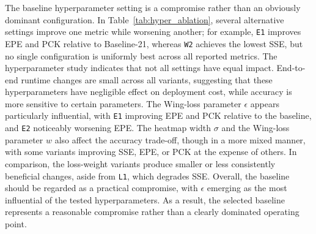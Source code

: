 ﻿\documentclass[10pt,letterpaper]{article}
\begin{document}
\medskip
\noindent
The baseline hyperparameter setting is a compromise rather than an obviously dominant configuration. In Table~\ref{tab:hyper_ablation}, several alternative settings improve one metric while worsening another; for example, \texttt{E1} improves EPE and PCK relative to Baseline-21, whereas \texttt{W2} achieves the lowest SSE, but no single configuration is uniformly best across all reported metrics. The hyperparameter study indicates that not all settings have equal impact. End-to-end runtime changes are small across all variants, suggesting that these hyperparameters have negligible effect on deployment cost, while accuracy is more sensitive to certain parameters. The Wing-loss parameter \(\epsilon\) appears particularly influential, with \texttt{E1} improving EPE and PCK relative to the baseline, and \texttt{E2} noticeably worsening EPE. The heatmap width \(\sigma\) and the Wing-loss parameter \(w\) also affect the accuracy trade-off, though in a more mixed manner, with some variants improving SSE, EPE, or PCK at the expense of others. In comparison, the loss-weight variants produce smaller or less consistently beneficial changes, aside from \texttt{L1}, which degrades SSE. Overall, the baseline should be regarded as a practical compromise, with \(\epsilon\) emerging as the most influential of the tested hyperparameters. As a result, the selected baseline represents a reasonable compromise rather than a clearly dominated operating point.
\end{document}
